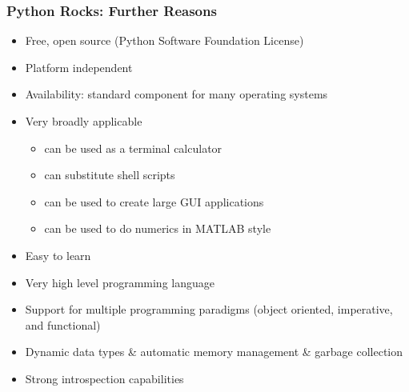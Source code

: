 \documentclass[t,10pt,compress=false,usepdftitle=false]{beamer}
\begin{document}
\begin{frame}[fragile]
    \frametitle{Python Rocks: Further Reasons}
     \begin{itemize}
    	\item Free, open source (Python Software Foundation License)
    	\item Platform independent
	\item Availability: standard component for many operating systems
    	\item Very broadly applicable
    	\begin{itemize}
    	     \item can be used as a terminal calculator
    	     \item can substitute shell scripts
    	     \item can be used to create large GUI applications
    	     \item can be used to do numerics in MATLAB style
	\end{itemize}
	\item Easy to learn
	\item Very high level programming language
	\item Support for multiple programming paradigms (object oriented, imperative, and functional)
	\item Dynamic data types \& automatic memory management \& garbage collection
	\item Strong introspection capabilities
    \end{itemize}
\end{frame}


\end{document}
